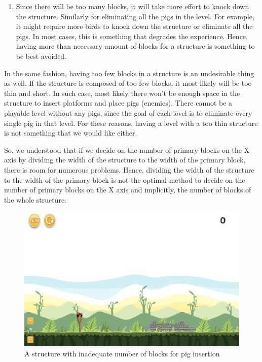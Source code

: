 \documentclass{dalthesis}
\begin{document}
\begin{enumerate}
\begin{enumerate}
    \item Since there will be too many blocks, it will take more effort to knock down the structure. Similarly for eliminating all the pigs in the level. For example, it might require more birds to knock down the structure or eliminate all the pigs. In most cases, this is something that degrades the experience. Hence, having more than necessary amount of blocks for a structure is something to be best avoided.
  \end{enumerate}

  In the same fashion, having too few blocks in a structure is an undesirable thing as well. If the structure is composed of too few blocks, it most likely will be too thin and short. In such case, most likely there won't be enough space in the structure to insert platforms and place pigs (enemies). There cannot be a playable level without any pigs, since the goal of each level is to eliminate every single pig in that level. For these reasons, having a level with a too thin structure is not something that we would like either.

  So, we understood that if we decide on the number of primary blocks on the X axis by dividing the width of the structure to the width of the primary block, there is room for numerous problems. Hence, dividing the width of the structure to the width of the primary block is not the optimal method to decide on the number of primary blocks on the X axis and implicitly, the number of blocks of the whole structure.

  \begin{figure}[h]
    \centering
    \caption{A structure with inadequate number of blocks for pig insertion}
    \includegraphics[width=\textwidth,height=\textheight,keepaspectratio]{process/inadequete_number_of_blocks.png}
  \end{figure}


\end{enumerate}
\end{document}
